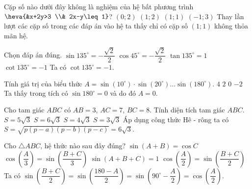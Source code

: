 \begin{ex}%
	Cặp số nào dưới đây không là nghiệm của hệ bất phương trình $\heva{&x+2y>3 \\& 2x-y\leq 1}$?
	\choice
	{$(0;2)$}
	{$(1;2)$}
	{\True $(1;1)$}
	{$(-1;3)$}
	\loigiai
	{
		Thay lần lượt các cặp số trong các đáp án vào hệ ta thấy chỉ có cặp số $(1;1)$ không thỏa mãn hệ. 
	}
\end{ex}

\begin{ex}%
	Chọn đáp án đúng. 
	\choice
	{$\sin 135^{\circ}=-\dfrac{\sqrt{2}}{2}$}
	{$\cos 45^{\circ}=-\dfrac{\sqrt{2}}{2}$}
	{$\tan 135^{\circ}=1$}
	{\True $\cot 135^{\circ}=-1$}
	\loigiai
	{
		Ta có $\cot 135^{\circ}=-1$.
	}
\end{ex}

\begin{ex}%
	Tính giá trị của biểu thức $A=\sin (10^{\circ}) \cdot \sin (20^{\circ}) \ldots \sin (180^{\circ})$.
	\choice
	{$4$}
	{$2$}
	{\True $0$}
	{$-2$}
	\loigiai
	{
		Ta thấy trong tích có $\sin 180^{\circ}=0$ và do đó $A=0$.
	}
\end{ex}

\begin{ex}%
	Cho tam giác $ABC$ có $AB=3$, $AC=7$, $BC=8$. Tính diện tích tam giác $ABC$.
	\choice
	{$S=5\sqrt{3}$}
	{\True $S=6\sqrt{3}$}
	{$S=4\sqrt{3}$}
	{$S=3\sqrt{3}$}
	\loigiai
	{
		Áp dụng công thức Hê - rông ta có $S=\sqrt{p(p-a)(p-b)(p-c)}=6\sqrt{3}$.
	}
\end{ex}

\begin{ex}%
	Cho $\triangle ABC$, hệ thức nào sau đây đúng?
	\choice
	{$\sin (A+B)=\cos C$}
	{$\cos \left(\dfrac{A}{3}\right)=\sin \left(\dfrac{B+C}{3}\right)$}
	{$\sin (A+B+C)=1$}
	{\True $\cos \left(\dfrac{A}{2}\right)=\sin \left(\dfrac{B+C}{2}\right)$}
	\loigiai
	{
		Ta có $\sin \left(\dfrac{B+C}{2}\right)=\sin \left(\dfrac{180-A}{2}\right)=\sin \left( 90^{\circ}-\dfrac{A}{2}\right)=\cos \left(\dfrac{A}{2}\right)$.
	}
\end{ex}


\cauds

